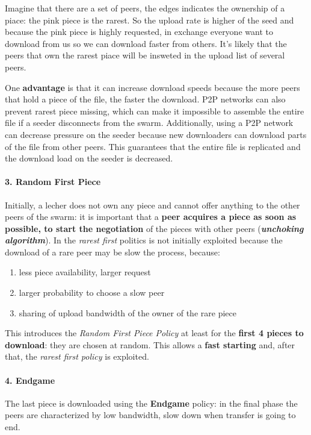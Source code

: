 \documentclass[10pt,a4paper]{report}
\begin{document}
Imagine that there are a set of peers, the edges indicates the ownership of a piace: the pink piece is the rarest. So the upload rate is higher of the seed and because the pink piece is highly requested, in exchange everyone want to download from us so we can download faster from others. It's likely that the peers that own the rarest piace will be insweted in the upload list of several peers.

One \textbf{advantage} is that it can increase download speeds because the more peers that hold a piece of the file, the faster the download. P2P networks can also prevent rarest piece missing, which can make it impossible to assemble the entire file if a seeder disconnects from the swarm. Additionally, using a P2P network can decrease pressure on the seeder because new downloaders can download parts of the file from other peers. This guarantees that the entire file is replicated and the download load on the seeder is decreased.
\paragraph{3. Random First Piece}\label{sec:3-random-first-piece}
Initially, a lecher does not own any piece and cannot offer anything to the other peers of the swarm: it is important that a \textbf{peer acquires a piece as soon as possible, to start the negotiation} of the pieces with other peers (\textit{\textbf{unchoking algorithm}}).
In the \textit{rarest first} politics is not initially exploited because the download of a rare peer may be slow the process, because:
\begin{enumerate}
	\item 
	less piece availability, larger request
	\item 
	larger probability to choose a slow peer
	\item 
	sharing of upload bandwidth of the owner of the rare piece
\end{enumerate}

This introduces the \textit{Random First Piece Policy} at least for the \textbf{first 4 pieces to download}: they are chosen at random. This allows a \textbf{fast starting} and, after that, the \textit{rarest first policy} is exploited.
\paragraph{4. Endgame}\label{sec:4-endgame}
The last piece is downloaded using the \textbf{Endgame} policy: in the final phase the peers are characterized by low bandwidth, slow down when transfer is going to end.
\end{document}
